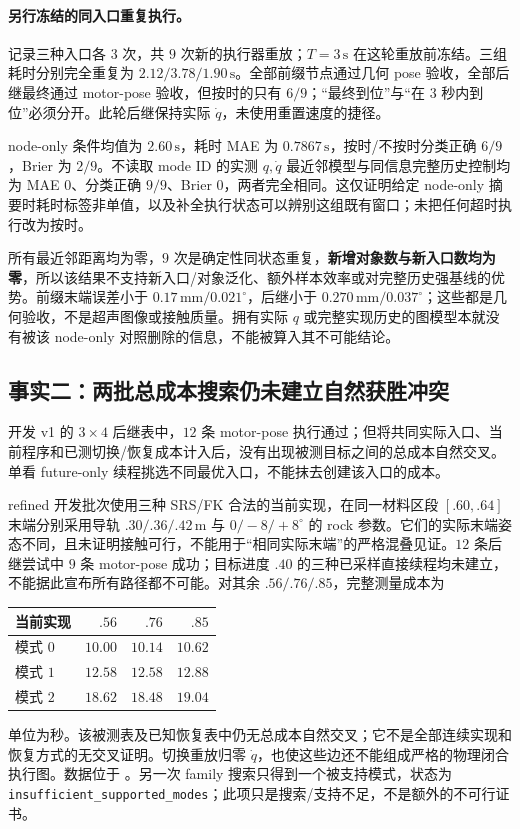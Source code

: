 \documentclass[11pt,a4paper,fontset=fandol]{ctexart}
\theoremstyle{definition}
\theoremstyle{remark}\newtheorem{remark}[theorem]{说明}
\numberwithin{equation}{section}
\begin{document}
\paragraph{另行冻结的同入口重复执行。}
 记录三种入口各 $3$ 次，共 $9$ 次新的执行器重放；$T=3\,\mathrm{s}$ 在这轮重放前冻结。三组耗时分别完全重复为 $2.12/3.78/1.90\,\mathrm{s}$。全部前缀节点通过几何 pose 验收，全部后继最终通过 motor-pose 验收，但按时的只有 $6/9$；“最终到位”与“在 $3$ 秒内到位”必须分开。此轮后继保持实际 $\dot q$，未使用重置速度的捷径。

node-only 条件均值为 $2.60\,\mathrm{s}$，耗时 MAE 为 $0.7867\,\mathrm{s}$，按时/不按时分类正确 $6/9$，Brier 为 $2/9$。不读取 mode ID 的实测 $q,\dot q$ 最近邻模型与同信息完整历史控制均为 MAE $0$、分类正确 $9/9$、Brier $0$，两者完全相同。这仅证明给定 node-only 摘要时耗时标签非单值，以及补全执行状态可以辨别这组既有窗口；未把任何超时执行改为按时。

所有最近邻距离均为零，$9$ 次是确定性同状态重复，\textbf{新增对象数与新入口数均为零}，所以该结果不支持新入口/对象泛化、额外样本效率或对完整历史强基线的优势。前缀末端误差小于 $0.17\,\mathrm{mm}/0.021^\circ$，后继小于 $0.270\,\mathrm{mm}/0.037^\circ$；这些都是几何验收，不是超声图像或接触质量。拥有实际 $q$ 或完整实现历史的图模型本就没有被该 node-only 对照删除的信息，不能被算入其不可能结论。


\subsection{事实二：两批总成本搜索仍未建立自然获胜冲突}
开发 v1 的 $3\times4$ 后继表中，$12$ 条 motor-pose 执行通过；但将共同实际入口、当前程序和已测切换/恢复成本计入后，没有出现被测目标之间的总成本自然交叉。单看 future-only 续程挑选不同最优入口，不能抹去创建该入口的成本。

refined 开发批次使用三种 SRS/FK 合法的当前实现，在同一材料区段 $[.60,.64]$ 末端分别采用导轨 $.30/.36/.42\,\mathrm m$ 与 $0/-8/+8^\circ$ 的 rock 参数。它们的实际末端姿态不同，且未证明接触可行，不能用于“相同实际末端”的严格混叠见证。$12$ 条后继尝试中 $9$ 条 motor-pose 成功；目标进度 $.40$ 的三种已采样直接续程均未建立，不能据此宣布所有路径都不可能。对其余 $.56/.76/.85$，完整测量成本为
\begin{center}
\begin{tabular}{lrrr}
\toprule 当前实现 & $.56$ & $.76$ & $.85$\\\midrule
模式 $0$ & $10.00$ & $10.14$ & $10.62$\\
模式 $1$ & $12.58$ & $12.58$ & $12.88$\\
模式 $2$ & $18.62$ & $18.48$ & $19.04$\\
\bottomrule
\end{tabular}
\end{center}
单位为秒。该被测表及已知恢复表中仍无总成本自然交叉；它不是全部连续实现和恢复方式的无交叉证明。切换重放归零 $\dot q$，也使这些边还不能组成严格的物理闭合执行图。数据位于 。另一次 family 搜索只得到一个被支持模式，状态为 \texttt{insufficient\_supported\_modes}；此项只是搜索/支持不足，不是额外的不可行证书。
\end{document}
